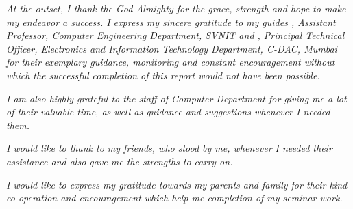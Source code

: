 \label{sec:ack}

	\textit{		
		\hspace*{10pt} At the outset, I thank the God Almighty for the grace, strength and hope to make my endeavor a success. I express my sincere gratitude to my guides \@stitleI \@supervisorI, Assistant Professor, Computer Engineering Department, SVNIT and \@stitleII \@supervisorII, Principal Technical Officer, Electronics and Information Technology Department, C-DAC, Mumbai for their exemplary guidance, monitoring and constant encouragement without which the successful completion of this report would not have been possible.
		\\
	}

	\textit{
		\hspace*{10pt} I am also highly grateful to the staff of Computer Department for giving me a lot of their valuable time, as well as guidance and suggestions whenever I needed them.
		\\
	}
	
	\textit{
		\hspace*{10pt} I would like to thank to my friends, who stood by me, whenever I needed their assistance and also gave me the strengths to carry on.
		\\
	}

	\textit{
		\hspace*{10pt} I would like to express my gratitude towards my parents and family for their kind co-operation and encouragement which help me completion of my seminar work.	
	}